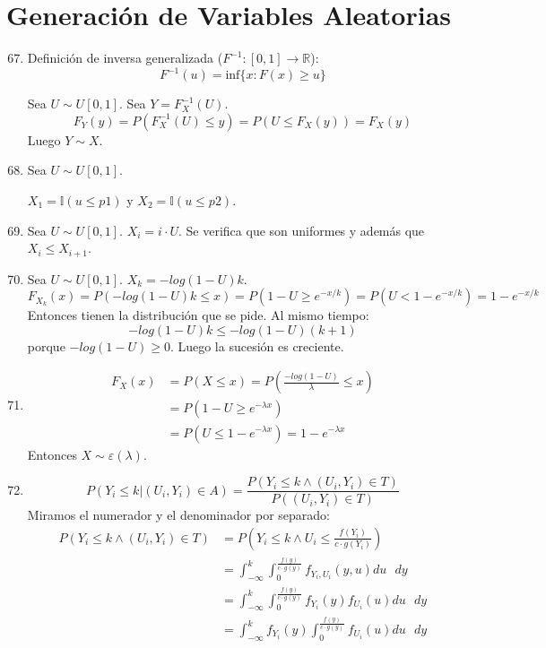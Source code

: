 \section{Generación de Variables Aleatorias}
\begin{enumerate}
	\setcounter{enumi}{66}
	\item
        Definición de inversa generalizada ($F^{-1}:[0,1]\rightarrow \mathbb{R}$):
        $$F^{-1}(u) = \text{inf}\{x:F(x)\geq u\}$$

        Sea $U\sim U[0,1]$. Sea $Y = F_X^{-1}(U)$.
        $$F_Y(y) = P(F_X^{-1}(U) \leq y) = P(U\leq F_X(y)) = F_X(y)$$
        Luego $Y\sim X$.
	\item
		Sea $U\sim U[0,1]$.

		$X_1 = \mathbb{I}(u\leq p1)$ y $X_2 = \mathbb{I}(u\leq p2)$.
	\item
		Sea $U\sim U[0,1]$. $X_i = i\cdot U$. Se verifica que son uniformes y además que $X_i \leq X_{i+1}$.
	\item
        Sea $U\sim U[0,1]$. $X_k = -log(1-U)k$.
        $$F_{X_k}(x) = P(-log(1-U)k \leq x) = P(1-U \geq e^{-x/k}) = P(U < 1 - e^{-x/k}) = 1-e^{-x/k}$$
        Entonces tienen la distribución que se pide. Al mismo tiempo:
        $$-log(1-U)k \leq -log(1-U)(k+1)$$ porque $-log(1-U) \geq 0$. Luego la sucesión es creciente.
	\item
		\begin{align*}
			F_X(x)	& = P(X\leq x) = P\left(\frac{-log(1-U)}{\lambda} \leq x\right)	\\
					& = P\left(1-U \geq e^{-\lambda x}\right)	\\
					& = P(U \leq 1 - e^{-\lambda x}) = 1 - e^{-\lambda x}
		\end{align*}
		Entonces $X\sim \varepsilon(\lambda)$.
	\item
		$$P(Y_i \leq k | (U_i, Y_i) \in A) = \frac{P(Y_i \leq k \land (U_i, Y_i) \in T)}{P( (U_i, Y_i) \in T)}$$
		Miramos el numerador y el denominador por separado:
		\begin{align*}
			P(Y_i \leq k \land (U_i, Y_i) \in T)	& = P\left(Y_i \leq k \land U_i \leq \frac{f(Y_i)}{c\cdot g(Y_i)}\right)		\\
									& = \int_{-\infty}^{k}\int_{0}^{\frac{f(y)}{c\cdot g(y)}} f_{Y_i,U_i}(y,u) du\text{ }dy			\\
									& = \int_{-\infty}^{k}\int_{0}^{\frac{f(y)}{c\cdot g(y)}} f_{Y_i}(y)f_{U_i}(u) du\text{ }dy		\\
									& = \int_{-\infty}^{k} f_{Y_i}(y) \int_{0}^{\frac{f(y)}{c\cdot g(y)}} f_{U_i}(u) du\text{ }dy	\\

\end{align*}
\end{enumerate}
